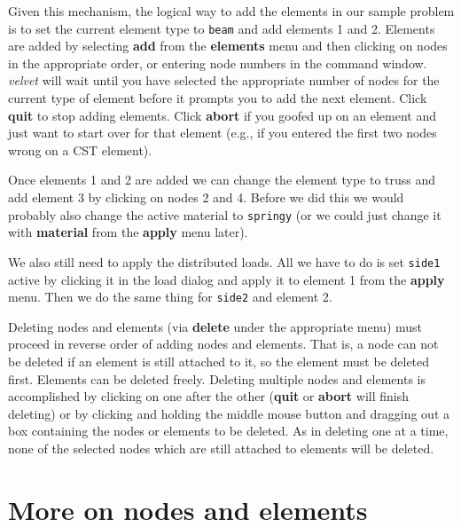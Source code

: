 Given this mechanism, the logical way to add the elements in our sample 
problem is to set the current element type to {\tt beam} and add elements 1
and 2.  Elements are added by selecting {\bf add} from the {\bf elements}
menu and then clicking on nodes in the appropriate order, or 
entering node numbers in the command window.  {\em velvet} will wait
until you have selected the appropriate number of nodes for the current
type of element before it prompts you to add the next element.
Click {\bf quit} to stop adding elements.  Click {\bf abort} if you
goofed up on an element and just want to start over for that element (e.g.,
if you entered the first two nodes wrong on a CST element).

Once elements 1 and 2 are added we can change the element type to truss
and add element 3 by clicking on nodes 2 and 4.  Before we did this we
would probably also change the active material to {\tt springy} (or we could
just change it with {\bf material} from the {\bf apply} menu later).

We also still need to apply the distributed loads.  All we have to do is
set {\tt side1} active by clicking it in the load dialog and apply it to 
element 1 from the {\bf apply} menu.  Then we do the same thing for
{\tt side2} and element 2.

Deleting nodes and elements (via {\bf delete} under the appropriate menu) must 
proceed in reverse order of adding nodes and elements.  That is, a node can
not be deleted if an element is still attached to it, so the element must be 
deleted first.  Elements can be deleted freely.  Deleting multiple nodes and 
elements is accomplished by clicking on one after the other ({\bf quit}
or {\bf abort}
will finish deleting) or by clicking and holding the middle mouse button and 
dragging out a box containing the nodes or elements to be deleted.  As in 
deleting one at a time, none of the selected nodes which are still attached to 
elements will be deleted.	

\section{More on nodes and elements}
